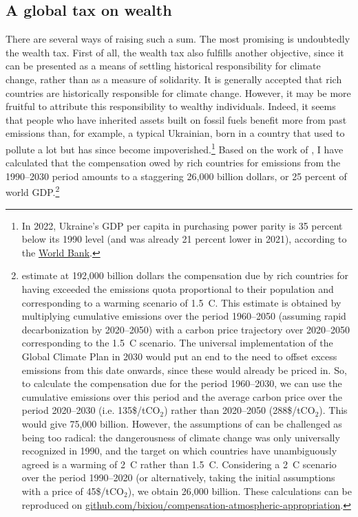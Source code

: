 \documentclass[a5paper,english,openany]{memoir}
\begin{document}
\subsection*{A global tax on wealth} %
There are several ways of raising such a sum. The most promising is undoubtedly the wealth tax. First of all, the wealth tax also fulfills another objective, since it can be presented as a means of settling 
historical responsibility for climate change, rather than as a measure of solidarity. It is generally accepted that rich countries are historically responsible for climate change. However, it may be more fruitful to attribute this responsibility to wealthy individuals. %
Indeed, it seems that people who have inherited assets built on fossil fuels benefit more from past emissions than, for example, a typical Ukrainian, born in a country that used to pollute a lot but has since become impoverished.\footnote{In 2022, Ukraine's GDP per capita in purchasing power parity is 35 percent below its 1990 level (and was already 21 percent lower in 2021), according to the \href{https://data.worldbank.org/indicator/NY.GDP.PCAP.PP.KD?locations=UA}{World Bank}.} %
Based on the work of \cite{fanning_compensation_2023}, I have calculated that the compensation owed by rich countries for emissions from the 1990--2030 period amounts to a staggering %
26,000 billion dollars, or 25 percent of world GDP.\footnote{\cite{fanning_compensation_2023} estimate at 192,000 billion dollars the compensation due by rich countries for having exceeded the emissions quota proportional to their population and corresponding to a warming scenario of 1.5~\textdegree{}C. This estimate is obtained by multiplying cumulative emissions over the period 1960--2050 (assuming rapid decarbonization by 2020--2050) %
with a carbon price trajectory over 2020--2050 corresponding to the 1.5~\textdegree{}C scenario. The universal implementation of the Global Climate Plan in 2030 would put an end to the need to offset excess emissions from this date onwards, since these would already be priced in. %
So, to calculate the compensation due for the period 1960--2030, we can use the cumulative emissions over this period and the average carbon price over the period 2020--2030 (i.e. 135\$/tCO$_\text{2}$) rather than 2020--2050 (288\$/tCO$_\text{2}$). This would give 75,000 billion. However, the assumptions of \cite{fanning_compensation_2023} can be challenged as being too radical: the dangerousness of %
climate change was only universally recognized %
in 1990, and the target on which countries have unambiguously agreed is a warming of 2~\textdegree{}C rather than 1.5~\textdegree{}C. Considering a 2~\textdegree{}C scenario over the period 1990--2020 (or alternatively, taking the initial assumptions with a price of 45\$/tCO$_\text{2}$), we obtain 26,000 billion. These calculations can be reproduced on \href{https://github.com/bixiou/compensation-atmospheric-appropriation}{github.com/bixiou/compensation-atmospheric-appropriation}.} 
\end{document}
